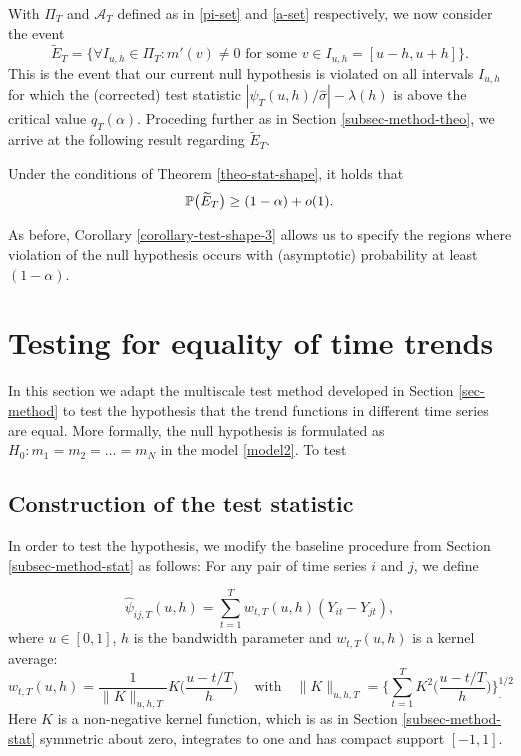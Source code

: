 \documentclass[a4paper,12pt]{article}
\numberwithin{equation}{section}
\begin{document}
With $\Pi_T$ and $\mathcal{A}_T$ defined as in \eqref{pi-set} and \eqref{a-set} respectively, we now consider the event 
\[ \widetilde{E}_T = \Big\{ \forall I_{u,h} \in \Pi_T: m'(v) \ne 0 \text{ for some } v \in I_{u,h} = [u-h,u+h] \Big\}. \]
This is the event that our current null hypothesis is violated on all intervals $I_{u,h}$ for which the (corrected) test statistic $|\widehat{\psi}_T(u,h)/\widehat{\sigma}| - \lambda(h)$ is above the critical value $q_T(\alpha)$. Proceding further as in Section \ref{subsec-method-theo}, we arrive at the following result regarding $\widetilde{E}_T$. 
\begin{corollary}\label{corollary-test-shape-3}
Under the conditions of Theorem \ref{theo-stat-shape}, it holds that  
\[ \mathbb{P} \big( \widetilde{E}_T \big) \ge (1-\alpha) + o(1). \] 
\end{corollary}

As before, Corollary \ref{corollary-test-shape-3} allows us to specify the regions where violation of the null hypothesis occurs with (asymptotic) probability at least $(1-\alpha)$.

\newpage
\section{Testing for equality of time trends}\label{sec-test-equality}

In this section we adapt the multiscale test method developed in Section \ref{sec-method} 
to test the hypothesis that the trend functions in different time series are equal. More formally, the null hypothesis is formulated as $H_0: m_1 = m_2 = \ldots = m_N$ in the model \eqref{model2}. To test 

\subsection{Construction of the test statistic}\label{subsec-test-equality-stat}

In order to test the hypothesis, we modify the baseline procedure from Section \ref{subsec-method-stat} as follows: For any pair of time series $i$ and $j$, we define

\begin{equation}\label{kernel-ave-equality}
\widehat{\psi}_{ij,T}(u,h) = \sum\limits_{t=1}^T w_{t,T}(u,h) (Y_{it} - Y_{jt}), 
\end{equation}
where $u\in [0,1]$, $h$ is the bandwidth parameter and $w_{t,T}(u,h)$ is a kernel average: 
\[ w_{t,T}(u,h) = \frac{1}{\|K\|_{u,h,T}} K\Big( \frac{u - t/T}{h} \Big) \, \quad \text{with} \quad \|K\|_{u,h,T} = \Big\{\sum\limits_{t=1}^T  K^2\Big( \frac{u - t/T}{h} \Big)\Big\}^{1/2}_. \]
Here $K$ is a non-negative kernel function, which is as in Section \ref{subsec-method-stat} symmetric about zero, integrates to one and has compact support $[-1,1]$.
\end{document}
